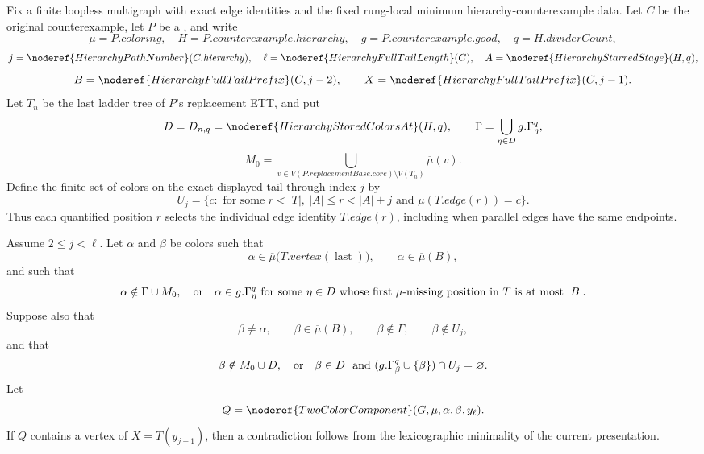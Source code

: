 \begin{lemma}
Fix a finite loopless multigraph with exact edge identities and the fixed
rung-local minimum hierarchy-counterexample data.  Let \(C\) be the
original counterexample, let \(P\) be a
, and write
\[
 \mu=P.\mathit{coloring},\quad
 H=P.\mathit{counterexample.hierarchy},\quad
 g=P.\mathit{counterexample.good},\quad
 q=H.\mathit{dividerCount},
\]
\[
 j=\noderef{HierarchyPathNumber}(C.\mathit{hierarchy}),\quad
 \ell=\noderef{HierarchyFullTailLength}(C),\quad
 A=\noderef{HierarchyStarredStage}(H,q),
\]
\[
 B=\noderef{HierarchyFullTailPrefix}(C,j-2),\qquad
 X=\noderef{HierarchyFullTailPrefix}(C,j-1).
\]
Let \(T_n\) be the last ladder tree of \(P\)'s replacement ETT, and put
\[
 D=D_{n,q}=\noderef{HierarchyStoredColorsAt}(H,q),\qquad
 \Gamma=\bigcup_{\eta\in D}g.\Gamma^q_\eta,
\]
\[
 M_0=\bigcup_{v\in
   V(P.\mathit{replacementBase.core})\setminus V(T_n)}
        \overline\mu(v).
\]
Define the finite set of colors on the exact displayed tail through
index \(j\) by
\[
 U_j=\{c:\text{ for some }r<|T|,\ |A|\le r<|A|+j
                 \text{ and }\mu(T.\mathit{edge}(r))=c\}.
\]
Thus each quantified position \(r\) selects the individual edge identity
\(T.\mathit{edge}(r)\), including when parallel edges have the same
endpoints.

Assume \(2\le j<\ell\).  Let \(\alpha\) and \(\beta\) be colors such that
\[
 \alpha\in\overline\mu\bigl(T.\mathit{vertex}(\operatorname{last})\bigr),
 \qquad \alpha\in\overline\mu(B),
\]
and such that
\[
 \alpha\notin\Gamma\cup M_0,
 \quad\hbox{or}\quad
 \alpha\in g.\Gamma^q_\eta\text{ for some }\eta\in D
 \text{ whose first \(\mu\)-missing position in \(T\) is at most }|B|.
\]
Suppose also that
\[
 \beta\ne\alpha,\qquad
 \beta\in\overline\mu(B),\qquad
 \beta\notin\Gamma,\qquad
 \beta\notin U_j,
\]
and that
\[
 \beta\notin M_0\cup D,
 \quad\hbox{or}\quad
 \beta\in D\ \text{ and }
   (g.\Gamma^q_\beta\cup\{\beta\})\cap U_j=\varnothing.
\]
Let
\[
 Q=\noderef{TwoColorComponent}(G,\mu,\alpha,\beta,y_\ell).
\]
If \(Q\) contains a vertex of \(X=T(y_{j-1})\), then a contradiction
follows from the lexicographic minimality of the current presentation.
\end{lemma}
